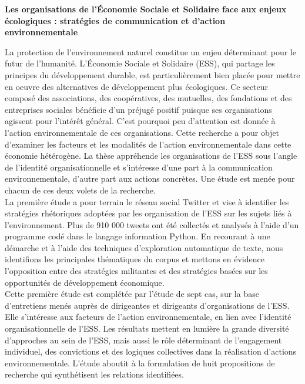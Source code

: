 \selectfont{}
\renewcommand*{\arraystretch}{1.2}


\begin{center}
  \large \textbf{Les organisations de l'Économie Sociale et Solidaire face aux enjeux écologiques : stratégies de communication et d'action environnementale}
\end{center}

\vspace{1cm}

La protection de l'environnement naturel constitue un enjeu déterminant pour le futur de l'humanité. L'Économie Sociale et Solidaire (ESS), qui partage les principes du développement durable, est particulièrement bien placée pour mettre en oeuvre des alternatives de développement plus écologiques. Ce secteur composé des associations, des coopératives, des mutuelles, des fondations et des entreprises sociales bénéficie d'un préjugé positif puisque ses organisations agissent pour l'intérêt général. C'est pourquoi peu d'attention est donnée à l'action environnementale de ces organisations. Cette recherche a pour objet d'examiner les facteurs et les modalités de l'action environnementale dans cette économie hétérogène. La thèse appréhende les organisations de l'ESS sous l'angle de l'identité organisationnelle et s'intéresse d'une part à la communication environnementale, d'autre part aux actions concrètes. Une étude est menée pour chacun de ces deux volets de la recherche.\\

La première étude a pour terrain le réseau social Twitter et vise à identifier les stratégies rhétoriques adoptées par les organisation de l'ESS sur les sujets liés à l'environnement. Plus de 910 000 tweets ont été collectés et analysés à l'aide d'un programme codé dans le langage information Python. En recourant à une démarche  et à l'aide des techniques d'exploration automatique de texte, nous identifions les principales thématiques du corpus et mettons en évidence l'opposition entre des stratégies militantes et des stratégies basées sur les opportunités de développement économique. \\

Cette première étude est complétée par l'étude de sept cas, sur la base d'entretiens menés auprès de dirigeantes et dirigeants d'organisations de l'ESS. Elle s'intéresse aux facteurs de l'action environnementale, en lien avec l'identité organisationnelle de l'ESS. Les résultats mettent en lumière la grande diversité d'approches au sein de l'ESS, mais aussi le rôle déterminant de l'engagement individuel, des convictions et des logiques collectives dans la réalisation d'actions environnementale. L'étude aboutit à la formulation de huit propositions de recherche qui synthétisent les relations identifiées. \\

